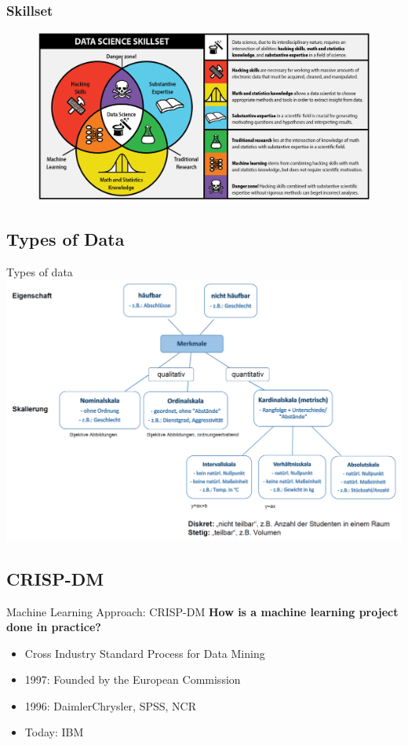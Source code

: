 \documentclass{beamer}
\begin{document}
	
\begin{frame}
\frametitle{Skillset}
\begin{figure}
\includegraphics[width = 1\linewidth]{figures/introduction/data_science_skillset}
\end{figure}
\end{frame}
	
	
	
\subsection{Types of Data}
\begin{frame}{Types of data}
\includegraphics[width=1\textwidth]{figures/introduction/variables}
\end{frame}	    

\subsection{CRISP-DM}
	\begin{frame}{Machine Learning Approach: CRISP-DM}
    \textbf{How is a machine learning project done in practice?} 
		\begin{itemize}
			\item Cross Industry Standard Process for Data Mining
			\item 1997: Founded by the European Commission
			\item 1996: DaimlerChrysler, SPSS, NCR
			\item Today: IBM
		\end{itemize}
	\end{frame}
\end{document}
